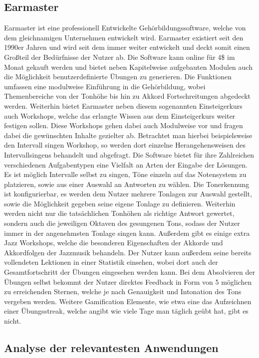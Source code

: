 \subsection*{Earmaster}
\label{sec:Earmaster}
Earmaster ist eine professionell Entwickelte Gehörbildungssoftware, welche von dem gleichnamigen Unternehmen entwickelt wird. Earmaster existiert seit den 1990er Jahren und wird seit dem immer weiter entwickelt und deckt somit einen Großteil der Bedürfnisse der Nutzer ab. Die Software kann online für
4\$ im Monat gekauft werden und bietet neben Kapitelweise aufgebauten Modulen auch die Möglichkeit benutzerdefinierte Übungen zu generieren. Die Funktionen umfassen eine modulweise Einführung in die Gehörbildung, wobei Themenbereiche von der Tonhöhe bis hin zu Akkord Fortschreitungen abgedeckt werden. Weiterhin bietet Earmaster neben diesem 
sogenannten Einsteigerkurs auch Workshops, welche das erlangte Wissen aus dem Einsteigerkurs weiter festigen sollen. Diese Workshops gehen dabei auch Modulweise vor und fragen dabei die gewünschten Inhalte gezielter ab. Betrachtet man hierbei beispielsweise den Intervall singen Workshop, 
so werden dort einzelne Herangehensweisen des Intervallsingens behandelt und abgefragt. Die Software bietet für ihre Zahlreichen verschiedenen Aufgabentypen eine Vielfalt an Arten der Eingabe der Lösungen. Es ist möglich Intervalle selbst zu singen, Töne einzeln auf das Notensystem zu platzieren, sowie aus einer Auswahl an 
Antworten zu wählen. Die Tonerkennung ist konfigurierbar, es werden dem Nutzer mehrere Tonlagen zur Auswahl gestellt, sowie die Möglichkeit gegeben seine eigene Tonlage zu definieren. Weiterhin werden nicht nur die tatsächlichen Tonhöhen als richtige Antwort gewertet, sondern auch die jeweiligen Oktaven des gesungenen Tons, sodass der Nutzer 
immer in der angenehmsten Tonlage singen kann. Außerdem gibt es einige extra Jazz Workshops, welche die besonderen Eigenschaften der Akkorde und Akkordfolgen der Jazzmusik behandeln. Der Nutzer kann außerdem seine bereits vollendeten Lektionen
in einer Statistik einsehen, wobei dort auch der Gesamtfortschritt der Übungen eingesehen werden kann. Bei dem Absolvieren der Übungen selbst bekommt der Nutzer direktes Feedback in Form von 5 möglichen zu erreichenden Sternen, welche je nach Genauigkeit und Intonation des Tons vergeben werden. Weitere Gamification Elemente, wie etwa eine 
das Aufzeichnen einer Übungsstreak, welche angibt wie viele Tage man täglich geübt hat, gibt es nicht. \cite{earmaster}

\subsection{Analyse der relevantesten Anwendungen}

